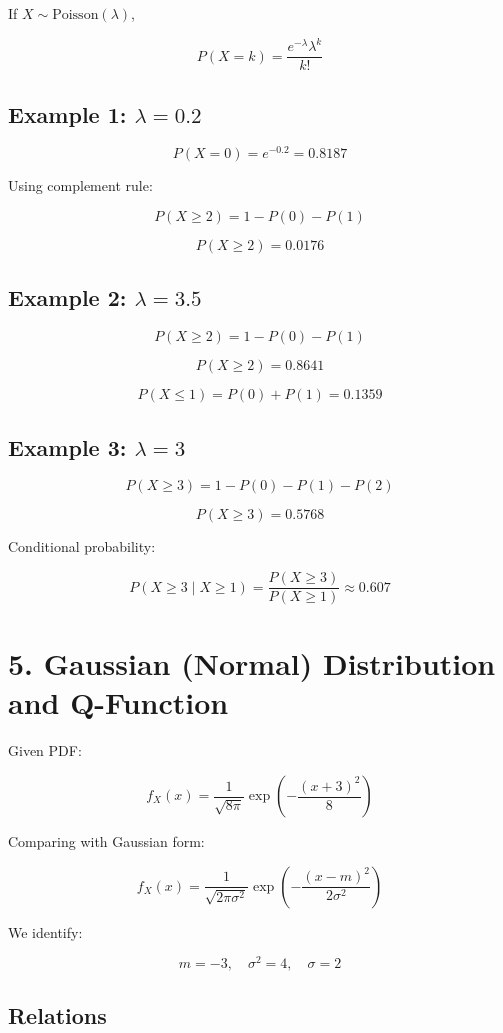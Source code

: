 \documentclass[12pt]{article}
\begin{document}
If $X \sim \text{Poisson}(\lambda)$,

\[
P(X = k) = \frac{e^{-\lambda}\lambda^k}{k!}
\]

\subsection*{Example 1: $\lambda = 0.2$}

\[
P(X=0) = e^{-0.2} = 0.8187
\]

Using complement rule:

\[
P(X \ge 2) = 1 - P(0) - P(1)
\]

\[
P(X \ge 2) = 0.0176
\]

\subsection*{Example 2: $\lambda = 3.5$}

\[
P(X \ge 2) = 1 - P(0) - P(1)
\]

\[
P(X \ge 2) = 0.8641
\]

\[
P(X \le 1) = P(0) + P(1) = 0.1359
\]

\subsection*{Example 3: $\lambda = 3$}

\[
P(X \ge 3) = 1 - P(0) - P(1) - P(2)
\]

\[
P(X \ge 3) = 0.5768
\]

Conditional probability:

\[
P(X \ge 3 \mid X \ge 1) 
= \frac{P(X \ge 3)}{P(X \ge 1)} 
\approx 0.607
\]

\section*{5. Gaussian (Normal) Distribution and Q-Function}

Given PDF:

\[
f_X(x) = \frac{1}{\sqrt{8\pi}} 
\exp\left(-\frac{(x+3)^2}{8}\right)
\]

Comparing with Gaussian form:

\[
f_X(x)=\frac{1}{\sqrt{2\pi\sigma^2}} 
\exp\left(-\frac{(x-m)^2}{2\sigma^2}\right)
\]

We identify:

\[
m=-3, \quad \sigma^2=4, \quad \sigma=2
\]

\subsection*{Relations}
\end{document}
